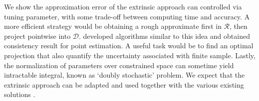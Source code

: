 \documentclass[10pt]{article}
\newcommand{\mc}[1]{\mathcal{#1}}
\DeclareMathOperator{\1}{\mathbbm{1}}
\begin{document}
We show the approximation error of the extrinsic approach can controlled via tuning parameter, with some trade-off between computing time and accuracy. A more efficient strategy would be obtaining a rough approximate first in $\mc R$, then project pointwise into $\mc D$. \cite{lin2016extrinsic} developed algorithms similar to this idea and obtained consistency result for point estimation. A useful task would be to find an optimal projection that also quantify the uncertainty associated with finite sample. Lastly, the normalization of parameters over constrained space can sometime yield intractable integral, known as `doubly stochastic' problem. We expect that the extrinsic approach can be adapted and used together with the various existing solutions \citep{rao2016data,stoehr2017noisy}.





\end{document}
